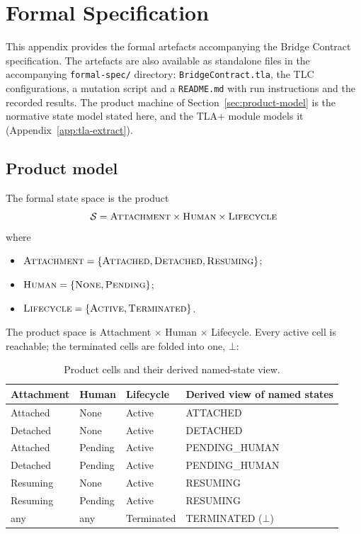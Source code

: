 \appendix
\section{Formal Specification}
\label{app:formal}

This appendix provides the formal artefacts accompanying the
Bridge Contract specification. The artefacts are also available as
standalone files in the accompanying \texttt{formal-spec/} directory:
\texttt{BridgeContract.tla}, the TLC configurations, a mutation script
and a \texttt{README.md} with run instructions and the recorded results.
The product machine of Section~\ref{sec:product-model} is the normative
state model stated here, and the TLA+ module models it (Appendix~\ref{app:tla-extract}).

\subsection{Product model}
\label{app:product-model}

The formal state space is the product
\[
\mathcal{S} = \textsc{Attachment} \times \textsc{Human} \times \textsc{Lifecycle}
\]
where
\begin{itemize}[leftmargin=2em]
\item $\textsc{Attachment} = \{\textsc{Attached},
\textsc{Detached}, \textsc{Resuming}\}$;
\item $\textsc{Human} = \{\textsc{None}, \textsc{Pending}\}$;
\item $\textsc{Lifecycle} = \{\textsc{Active}, \textsc{Terminated}\}$.
\end{itemize}

The product space is Attachment $\times$ Human $\times$ Lifecycle. Every
active cell is reachable; the terminated cells are folded into
one, $\bot$:

\footnotesize
\begin{longtable}{l l l p{}}
\caption{Product cells and their derived named-state view.}\label{tab:cells}\\
\toprule
\textbf{Attachment} & \textbf{Human} & \textbf{Lifecycle} & \textbf{Derived view of named states} \\
\midrule
Attached & None & Active & ATTACHED \\
Detached & None & Active & DETACHED \\
Attached & Pending & Active & PENDING\_HUMAN \\
Detached & Pending & Active & PENDING\_HUMAN \\
Resuming & None & Active & RESUMING \\
Resuming & Pending & Active & RESUMING \\
any & any & Terminated & TERMINATED ($\bot$) \\
\bottomrule
\end{longtable}

